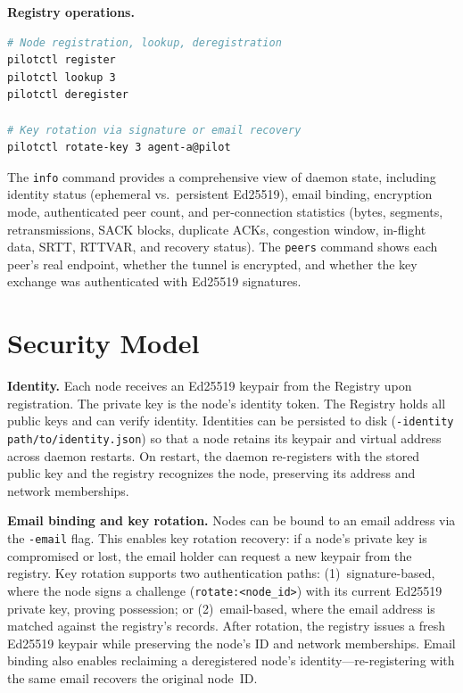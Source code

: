\documentclass[11pt,a4paper]{article}
\begin{document}
\textbf{Registry operations.}

\begin{lstlisting}[language=bash]
# Node registration, lookup, deregistration
pilotctl register
pilotctl lookup 3
pilotctl deregister

# Key rotation via signature or email recovery
pilotctl rotate-key 3 agent-a@pilot
\end{lstlisting}

The \texttt{info} command provides a comprehensive view of daemon state, including identity status (ephemeral vs.\ persistent Ed25519), email binding, encryption mode, authenticated peer count, and per-connection statistics (bytes, segments, retransmissions, SACK blocks, duplicate ACKs, congestion window, in-flight data, SRTT, RTTVAR, and recovery status). The \texttt{peers} command shows each peer's real endpoint, whether the tunnel is encrypted, and whether the key exchange was authenticated with Ed25519 signatures.

\section{Security Model}

\textbf{Identity.} Each node receives an Ed25519 keypair from the Registry upon registration. The private key is the node's identity token. The Registry holds all public keys and can verify identity. Identities can be persisted to disk (\texttt{-identity path/to/identity.json}) so that a node retains its keypair and virtual address across daemon restarts. On restart, the daemon re-registers with the stored public key and the registry recognizes the node, preserving its address and network memberships.

\textbf{Email binding and key rotation.} Nodes can be bound to an email address via the \texttt{-email} flag. This enables key rotation recovery: if a node's private key is compromised or lost, the email holder can request a new keypair from the registry. Key rotation supports two authentication paths: (1)~signature-based, where the node signs a challenge (\texttt{rotate:<node\_id>}) with its current Ed25519 private key, proving possession; or (2)~email-based, where the email address is matched against the registry's records. After rotation, the registry issues a fresh Ed25519 keypair while preserving the node's ID and network memberships. Email binding also enables reclaiming a deregistered node's identity---re-registering with the same email recovers the original node~ID.
\end{document}
